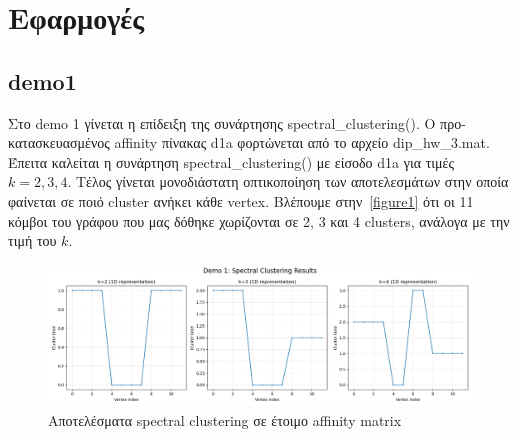 \documentclass{article}
\begin{document}
\section{Εφαρμογές}
\subsection{demo1} 
Στο demo 1 γίνεται η επίδειξη της συνάρτησης spectral\_clustering(). Ο 
προ-κατασκευασμένος affinity πίνακας d1a φορτώνεται από το αρχείο dip\_hw\_3.mat. 
Έπειτα καλείται η συνάρτηση spectral\_clustering() με είσοδο d1a για τιμές $k = 2,3,4$.
Τέλος γίνεται μονοδιάστατη οπτικοποίηση των αποτελεσμάτων στην οποία φαίνεται 
σε ποιό cluster ανήκει κάθε vertex. 
Βλέπουμε στην~\autoref{figure1} ότι οι 11 κόμβοι του γράφου που μας δόθηκε
χωρίζονται σε 2, 3 και 4 clusters, ανάλογα με την τιμή του $k$.

\begin{figure}
    \centering
    \includegraphics[width=\linewidth]{Figure_1.png}
    \caption{Αποτελέσματα spectral clustering σε έτοιμο affinity matrix}\label{figure1}
\end{figure}
\end{document}
